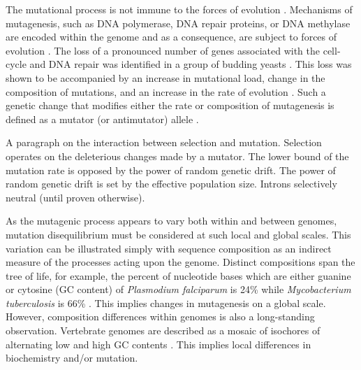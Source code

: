 The mutational process is not immune to the forces of evolution \citep{Lynch2016GeneticRate}. Mechanisms of mutagenesis, such as DNA polymerase, DNA repair proteins, or DNA methylase are encoded within the genome and as a consequence, are subject to forces of evolution \citep{Lynch2010EvolutionRate}. The loss of a pronounced number of genes associated with the cell-cycle and DNA repair was identified in a group of budding yeasts \citep{Steenwyk2019ExtensiveYeasts}. This loss was shown to be accompanied by an increase in mutational load, change in the composition of mutations, and an increase in the rate of evolution \citep{Steenwyk2019ExtensiveYeasts}. Such a genetic change that modifies either the rate or composition of mutagenesis is defined as a mutator (or antimutator) allele \citep{Lynch2016GeneticRate}.

A paragraph on the interaction between selection and mutation. Selection operates on the deleterious changes made by a mutator. The lower bound of the mutation rate is opposed by the power of random genetic drift. The power of random genetic drift is set by the effective population size. Introns selectively neutral (until proven otherwise). 

As the mutagenic process appears to vary both within and between genomes, mutation disequilibrium must be considered at such local and global scales. This variation can be illustrated simply with sequence composition as an indirect measure of the processes acting upon the genome. Distinct compositions span the tree of life, for example, the percent of nucleotide bases which are either guanine or cytosine (GC content) of \textit{Plasmodium falciparum} is 24\% while \textit{Mycobacterium tuberculosis} is  66\% \citep{Nakamura2000Codon2000}. This implies changes in mutagenesis on a global scale. However, composition differences within genomes is also a long-standing observation. Vertebrate genomes are described as a mosaic of isochores of alternating low and high GC contents \citep{Bernardi1989TheGenome, Bernardi2000IsochoresVertebrates}. This implies local differences in biochemistry and/or mutation. 


